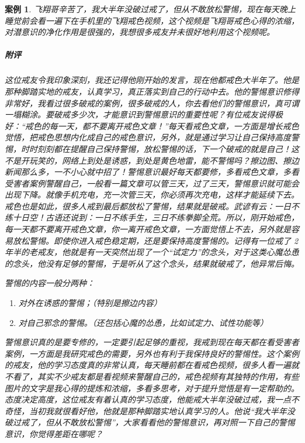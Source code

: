 \documentclass{ctexart}
\newtheorem{case}{案例}
\begin{document}
\begin{case}
    飞翔哥辛苦了，我大半年没破过戒了，但从不敢放松警惕，现在每天晚上睡觉前会看一遍下在手机里的飞翔戒色视频，这个视频是飞翔哥戒色心得的浓缩，对潜意识的净化作用是很强的，我想很多戒友并未很好地利用这个视频呢。
    \subparagraph{附评} 这位戒友令我印象深刻，我还记得他刚开始的发言，现在他都戒色大半年了。他是那种脚踏实地的戒友，认真学习，真正落实到自己的行动中去。他的警惕意识修得非常好，我看过很多破戒的案例，很多破戒的人，你去看他们的警惕意识，真可谓一塌糊涂。要破戒多少次，才能意识到警惕意识的重要性呢？有位戒友说得极好：“戒色的每一天，都不要离开戒色文章！”每天看戒色文章，一方面是增长戒色觉悟，把戒色思想内化成自己的戒色意识，另外，就是通过学习让自己保持高度警惕，时时刻刻都在提醒自己保持警惕，放松警惕的话，下一个破戒的就是自己！这不是开玩笑的，网络上到处是诱惑，到处是黄色地雷，能不警惕吗？擦边图、擦边新闻那么多，一不小心就中招了！警惕意识最好每天都要修，多看戒色文章，多看受害者案例警醒自己，一般看一篇文章可以管三天，过了三天，警惕意识就可能会出现下降。就像手机充电，充一次管三天，你必须再次充电，这样才能延续下去。戒色也是如此，很多人戒到最后都放松了警惕，结果就是破戒。武谚有云：一日不练十日空！古语还说到：一日不练手生，三日不练拳脚全荒。所以，刚开始戒色，每一天都不要离开戒色文章，你一离开戒色文章，一方面觉悟上不去，另外就是容易放松警惕。即使你进入戒色稳定期，还是要保持高度警惕的。记得有一位戒了 2 年半的老戒友，他就是有一天突然出现了一个“试定力”的念头，对于这类心魔怂恿的念头，他没有足够的警惕，于是听从了这个念头，结果就破戒了，他异常后悔。

    警惕的内容一般分两种：

    \begin{enumerate}
        \item 对外在诱惑的警惕；（特别是擦边内容）
        \item 对自己邪念的警惕。（还包括心魔的怂恿，比如试定力、试性功能等）
    \end{enumerate}

    警惕意识真的是要专修的，一定要引起足够的重视，我戒到现在每天都在看受害者案例，一方面是我研究戒色的需要，另外也有利于我保持良好的警惕性。这个案例的戒友，他的学习态度真的非常认真，每天睡前都在看戒色视频，很多人看一遍就不看了，其实不少戒友都是看视频来警醒自己的，戒色视频有其独特的作用，有些图片的文字是我心得的提炼和浓缩，多看多思考，对于提升觉悟是有一定帮助的。态度决定高度，这位戒友有着认真的学习态度，他能戒大半年没破过戒，我一点不奇怪，当初我就很看好他，他就是那种脚踏实地认真学习的人。他说“我大半年没破过戒了，但从不敢放松警惕”，大家看看他的警惕意识，再对照一下自己的警惕意识，你觉得差距在哪呢？
\end{case}
\end{document}
